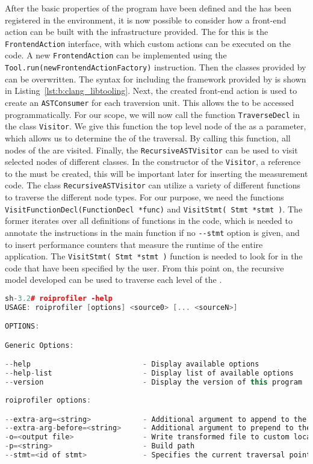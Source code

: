 After the basic properties of the program have been defined and the \TOOL has been registered in the \CLANG environment, it is now possible to consider how a front-end action can be built with the infrastructure provided. The \ENTPOI for this is the \lstinline{FrontendAction} interface, with which custom actions can be executed on the code. A new \lstinline{FrontendAction} can be implemented using the \lstinline{Tool.run(newFrontendActionFactory)} instruction. Then the classes provided by \CLANG can be overwritten. The \CPP syntax for including the framework provided by \CLANG is shown in Listing~\ref{lst:b:clang_libtooling}. Next, the created front-end action is used to create an \lstinline{ASTConsumer} for each traversion unit. This allows the \astsmall to be accessed programmatically. For our scope, we will now call the function \lstinline{TraverseDecl} in the class \lstinline{Visitor}. We give this function the top level node of the \astsmall as a parameter, which allows us to determine the \ENTPOI of the traversal. By calling this function, all nodes of the \astsmall are visited. Finally, the \lstinline{RecursiveASTVisitor} can be used to visit selected nodes of different classes. In the constructor of the \lstinline{Visitor}, a reference to the \SOUMNG must be created, this will be important later for inserting the measurement code. The class \lstinline{RecursiveASTVisitor} can utilize a variety of different functions to traverse the different node types. For our purpose, we need the functions \lstinline{VisitFunctionDecl(FunctionDecl *func)} and \lstinline{VisitStmt( Stmt *stmt )}. The former iterates over all definitions of functions in the code, which is needed to annotate the instructions in the main function if no \lstinline{--stmt} option is given, and to insert performance counters that measure the runtime of the entire application. The \lstinline{VisitStmt( Stmt *stmt )} function is needed to look for \STATS in the code that have been specified by the user. From this point on, the recursive model developed can be used to traverse each level of the \astsmall. 

\begin{lstlisting}[float, language=C++, caption=The Synopsis of the \TOOL.,basicstyle=\footnotesize\ttfamily\tiny, label=lst:b:tool_synopsis]
sh-3.2# roiprofiler -help
USAGE: roiprofiler [options] <source0> [... <sourceN>]

OPTIONS:

Generic Options:

--help                          - Display available options
--help-list                     - Display list of available options
--version                       - Display the version of this program
    
roiprofiler options:

--extra-arg=<string>            - Additional argument to append to the compiler command line
--extra-arg-before=<string>     - Additional argument to prepend to the compiler command line
-o=<output file>                - Write transformed file to custom location
-p=<string>                     - Build path
--stmt=<id of stmt>             - Specifies the current traversal point
\end{lstlisting}

